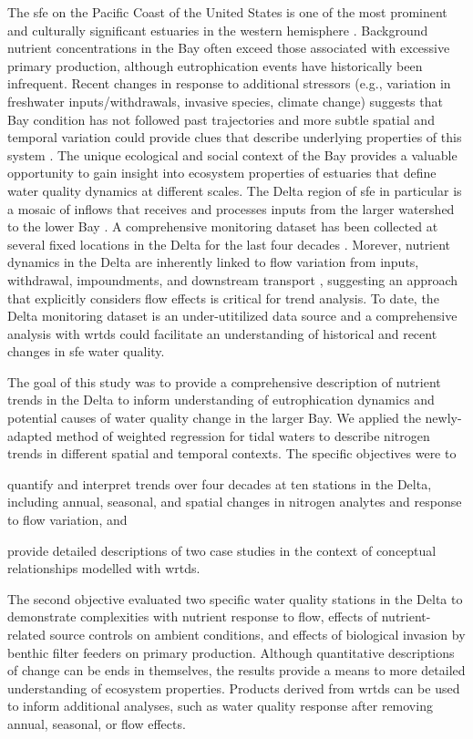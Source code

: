 \documentclass[journal = esthag, manuscript = article]{achemso}\usepackage[]{graphicx}\usepackage[]{color}
\begin{document}
The \ac{sfe} on the Pacific Coast of the United States is one of the most prominent and culturally significant estuaries in the western hemisphere \cite{Cloern15}.  Background nutrient concentrations in the Bay often exceed those associated with excessive primary production, although eutrophication events have historically been infrequent.  Recent changes in response to additional stressors (e.g., variation in freshwater inputs/withdrawals, invasive species, climate change) suggests that Bay condition has not followed past trajectories and more subtle spatial and temporal variation could provide clues that describe underlying properties of this system \cite{Cloern12b}.  The unique ecological and social context of the Bay provides a valuable opportunity to gain insight into ecosystem properties of estuaries that define water quality dynamics at different scales. The Delta region of \ac{sfe} in particular is a mosaic of inflows that receives and processes inputs from the larger watershed to the lower Bay \cite{Jassby00,Jassby02,Jassby08}. A comprehensive monitoring dataset has been collected at several fixed locations in the Delta for the last four decades \cite{Jabusch16}.  Morever, nutrient dynamics in the Delta are inherently linked to flow variation from inputs, withdrawal, impoundments, and downstream transport \cite{Novick15}, suggesting an approach that explicitly considers flow effects is critical for trend analysis.  To date, the Delta monitoring dataset is an under-utitilized data source and a comprehensive analysis with \ac{wrtds} could facilitate an understanding of historical and recent changes in \ac{sfe} water quality.

The goal of this study was to provide a comprehensive description of nutrient trends in the Delta to inform understanding of eutrophication dynamics and potential causes of water quality change in the larger Bay. We applied the newly-adapted method of weighted regression for tidal waters to describe nitrogen trends in  different spatial and temporal contexts. The specific objectives were to \begin{inparaenum}[1\upshape)]  
\item quantify and interpret trends over four decades at ten stations in the Delta, including annual, seasonal, and spatial changes in nitrogen analytes and response to flow variation, and
\item provide detailed descriptions of two case studies in the context of conceptual relationships modelled with \ac{wrtds}.
\end{inparaenum}
The second objective evaluated two specific water quality stations in the Delta to demonstrate complexities with nutrient response to flow, effects of nutrient-related source controls on ambient conditions, and effects of biological invasion by benthic filter feeders on primary production. Although quantitative descriptions of change can be ends in themselves, the results provide a means to more detailed understanding of ecosystem properties.  Products derived from \ac{wrtds} can be used to inform additional analyses, such as water quality response after removing annual, seasonal, or flow effects.
\end{document}
